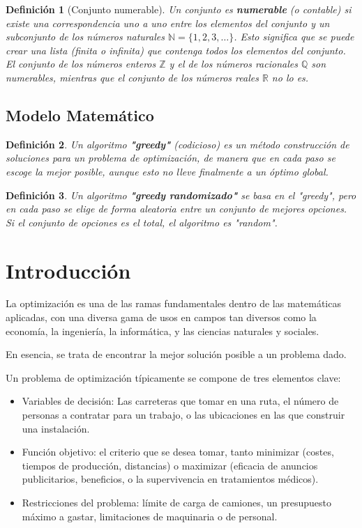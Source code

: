 \documentclass[12pt,a4paper]{book}
\newtheorem{defi}{Definición}[section]
\begin{document}
\begin{defi}[Conjunto numerable]
Un conjunto es \textbf{numerable} (o contable) si existe una correspondencia uno a uno entre los elementos del conjunto y un subconjunto de los números naturales $\mathbb{N} = \{1, 2, 3, \dots\}$. Esto significa que se puede crear una lista (finita o infinita) que contenga todos los elementos del conjunto. El conjunto de los números enteros $\mathbb{Z}$ y el de los números racionales $\mathbb{Q}$ son numerables, mientras que el conjunto de los números reales $\mathbb{R}$ no lo es.
\end{defi}
\section{Modelo Matemático}

\begin{defi}
Un algoritmo \textbf{"greedy"} (codicioso) es un método construcción de soluciones para un problema de optimización,
de manera que en cada paso se escoge la mejor posible, aunque esto no lleve finalmente a un óptimo global.
\end{defi}

\bigskip

\begin{defi}
Un algoritmo \textbf{"greedy randomizado"} se basa en el "greedy", pero en cada paso se elige de forma aleatoria entre un conjunto de mejores opciones.
Si el conjunto de opciones es el total, el algoritmo es "random".
\end{defi}

\chapter{Introducción}
La optimización es una de las ramas fundamentales dentro de las matemáticas aplicadas, con una diversa gama de usos en campos tan diversos como la economía, la ingeniería, la informática, y las ciencias naturales y sociales.

En esencia, se trata de encontrar la mejor solución posible a un problema dado.

Un problema de optimización típicamente se compone de tres elementos clave:
\begin{itemize}
    \item Variables de decisión: Las carreteras que tomar en una ruta, el número de personas a contratar para un trabajo, o las ubicaciones en las que construir una instalación.
    \item Función objetivo: el criterio que se desea tomar, tanto minimizar (costes, tiempos de producción, distancias) o maximizar (eficacia de anuncios publicitarios, beneficios, o la supervivencia en tratamientos médicos).
    \item Restricciones del problema: límite de carga de camiones, un presupuesto máximo a gastar, limitaciones de maquinaria o de personal.
\end{itemize}
\end{document}

